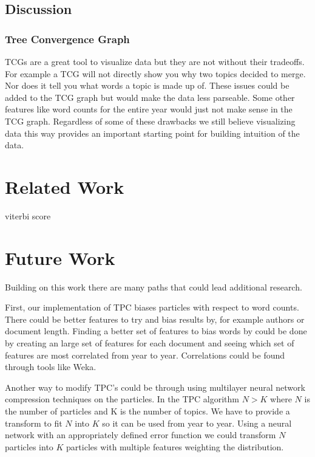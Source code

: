 \documentclass[conference]{IEEEtran}
\begin{document}
\subsection{Discussion}

\subsubsection{Tree Convergence Graph}
TCGs are a great tool to visualize data but they are not without their tradeoffs. For example a TCG will not directly show you why two topics decided to merge. Nor does it tell you what words a topic is made up of. These issues could be added to the TCG graph but would make the data less parseable. Some other features like word counts for the entire year would just not make sense in the TCG graph. Regardless of some of these drawbacks we still believe visualizing data this way provides an important starting point for building intuition of the data.


\section{Related Work}
viterbi score
\section{Future Work}
Building on this work there are many paths that could lead additional research.

First, our implementation of TPC biases particles with respect to word counts. There could be better features to try and bias results by, for example authors or document length. Finding a better set of features to bias words by could be done by creating an large set of features for each document and seeing which set of features are most correlated from year to year. Correlations could be found through tools like Weka. 

Another way to modify TPC's could be through using multilayer neural network compression techniques on the particles. In the TPC algorithm $N>K$ where $N$ is the number of particles and K is the number of topics. We have to provide a transform to fit $N$ into $K$ so it can be used from year to year. Using a neural network with an appropriately defined error function we could transform $N$ particles into $K$ particles with multiple features weighting the distribution.
\end{document}
